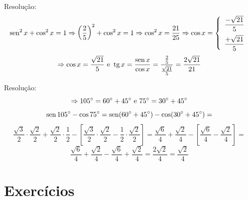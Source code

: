\begin{texample}
        \centering
\end{texample}
Resolução:
\[\operatorname{sen}^2 x + \cos^2 x = 1 \Rightarrow \left(\dfrac{2}{5}\right)^2 + \cos^2 x = 1 \Rightarrow \cos^2 x  = \dfrac{21}{25}\Rightarrow \cos x =  
    \left\{  
         \begin{array}{c}
            \dfrac{-\sqrt{21}}{5} \\[0.3cm]
		  \dfrac{+\sqrt{21}}{5} \\
	\end{array} 
    \right. 
\]
\[
\Rightarrow \cos x = \dfrac{\sqrt{21}}{5} \text{ e } \operatorname{tg} x = \dfrac{\operatorname{sen} x}{\cos x} = \dfrac{\frac{2}{5}}{\frac{\sqrt{21}}{5}} = \dfrac{2 \sqrt{21}}{21}
\]

\begin{texample}
        \centering
\end{texample}
Resolução:
\[
\Rightarrow 105 \degree = 60 \degree + 45 \degree \text{ e } 75 \degree = 30 \degree + 45 \degree
\]
\[
\operatorname{sen} 105 \degree - \cos 75 \degree = \operatorname{sen}(60 \degree + 45 \degree) - \cos(30 \degree + 45 \degree) =
\]
\[
\dfrac{\sqrt{3}}{2} \cdot \dfrac{\sqrt{2}}{2} + \dfrac{\sqrt{2}}{2} \cdot \dfrac{1}{2} - \left[ \dfrac{\sqrt{3}}{2} \cdot \dfrac{\sqrt{2}}{2} - \dfrac{1}{2} \cdot  \dfrac{\sqrt{2}}{2}  \right] = \dfrac{\sqrt{6}}{4} + \dfrac{\sqrt{2}}{4} - \left[ \dfrac{\sqrt{6}}{4} - \dfrac{\sqrt{2}}{4} \right] =
\]
\[
\dfrac{\sqrt{6}}{4} + \dfrac{\sqrt{2}}{4} -  \dfrac{\sqrt{6}}{4} + \dfrac{\sqrt{2}}{4} =
\dfrac{2 \sqrt{2}}{4} = \dfrac{\sqrt{2}}{4}
\]

 \section{Exercícios}

